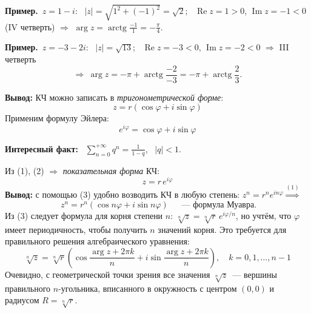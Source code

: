 \documentclass[a4paper,11pt]{article}
\newcommand{\prim}{\textbf{Пример.}\ }
\newcommand{\rarctg}{\operatorname{arctg}}
\newcommand{\Rez}{\operatorname{Re}}
\newcommand{\Imz}{\operatorname{Im}}
\begin{document}
\prim $z=1-i$: \ $|z|=\sqrt{1^2+(-1)^2}=\sqrt2$; \ $\Rez z=1>0$, $\Imz z=-1<0$ (IV четверть)
$\Rightarrow$ $\arg z=\rarctg\frac{-1}{1}=-\frac\pi4$.

\begin{minipage}[c]{0.56\linewidth}
\prim $z=-3-2i$: \ $|z|=\sqrt{13}$; \ $\Rez z=-3<0$, $\Imz z=-2<0$ $\Rightarrow$ III четверть
\[
\Rightarrow\ \arg z=-\pi+\rarctg\frac{-2}{-3}=-\pi+\rarctg\frac23.
\]
\end{minipage}\hfill
\begin{minipage}[c]{0.4\linewidth}
\centering
{}
\end{minipage}

\medskip
\textbf{Вывод:} КЧ можно записать в \emph{тригонометрической форме}:
\[
\boxed{\ z=r(\cos\varphi+i\sin\varphi)\ }\tag{1}
\]
Применим формулу Эйлера:
\[
\boxed{\ e^{i\varphi}=\cos\varphi+i\sin\varphi\ }\tag{2}
\]
\begin{hwbox}
\textbf{Интересный факт:} \ $\displaystyle\sum_{n=0}^{+\infty}q^n=\frac{1}{1-q}$, \ $|q|<1$.
\end{hwbox}
Из (1), (2) $\Rightarrow$ \emph{показательная форма} КЧ:
\[
\boxed{\ z=r\,e^{i\varphi}\ }\tag{3}
\]
\textbf{Вывод:} с помощью (3) удобно возводить КЧ в любую степень:
$z^n=r^ne^{in\varphi}\overset{(1)}{\Longrightarrow}$
\[
\boxed{\ z^n=r^n(\cos n\varphi+i\sin n\varphi)\ }\quad\text{~--- формула Муавра.}\tag{4}
\]
Из (3) следует формула для корня степени $n$: $\sqrt[n]z=\sqrt[n]r\,e^{i\varphi/n}$, но учтём, что
$\varphi$ имеет периодичность, чтобы получить $n$ значений корня. Это требуется для правильного
решения алгебраического уравнения:
\[
\boxed{\ \sqrt[n]z=\sqrt[n]r\left(\cos\frac{\arg z+2\pi k}{n}+i\sin\frac{\arg z+2\pi k}{n}\right),
\quad k=0,1,\dots,n-1\ }\tag{5}
\]
Очевидно, с геометрической точки зрения все значения $\sqrt[n]z$~--- вершины правильного
$n$-угольника, вписанного в окружность с центром $(0,0)$ и радиусом $R=\sqrt[n]r$.
\end{document}
